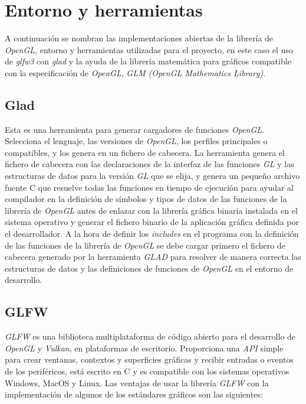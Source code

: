 \documentclass[a4paper]{book}
\begin{document}
\section{Entorno y herramientas}
\label{sec:Entorno}

A continuación se nombran las implementaciones abiertas de la librería de \textit{OpenGL}, entorno y herramientas
utilizadas para el proyecto, en este caso el uso de \textit{glfw3} con \textit{glad} y la ayuda de la librería matemática
para gráficos compatible con la especificación de \textit{OpenGL}, \textit{GLM (OpenGL Mathematics Library)}.

\subsection{Glad}
\label{subsec:Glad}

Esta es una herramienta para generar cargadores de funciones \textit{OpenGL}. Selecciona el lenguaje, las versiones
de \textit{OpenGL}, los perfiles principales o compatibles, y los genera en un fichero de cabecera. La herramienta
genera el fichero de cabecera con las declaraciones de la interfaz de las funciones \textit{GL} y
las estructuras de datos para la versión \textit{GL} que se elija, y genera un pequeño archivo fuente C que
resuelve todas las funciones en tiempo de ejecución para ayudar al compilador en la definición de
símbolos y tipos de datos de las funciones de la librería de \textit{OpenGL} antes de enlazar con la librería
gráfica binaria instalada en el sistema operativo y generar el fichero binario de la aplicación gráfica
definida por el desarrollador. A la hora de definir los \textit{includes} en el programa con la definición de las funciones de la librería de
\textit{OpenGL} se debe cargar primero el fichero de cabecera generado por la herramienta \textit{GLAD} para resolver de
manera correcta las estructuras de datos y las definiciones de funciones de \textit{OpenGL} en el entorno de
desarrollo. \cite{Khronos:_glad}

\subsection{GLFW}
\label{subsec:GLFW}

\textit{GLFW} es una biblioteca multiplataforma de código abierto para el desarrollo de \textit{OpenGL} y \textit{Vulkan},
en plataformas de escritorio. Proporciona una \textit{API} simple para crear ventanas, contextos y superficies
gráficas y recibir entradas o eventos de los periféricos, está escrito en C y es compatible con los sistemas
operativos Windows, MacOS y Linux. Las ventajas de usar la librería \textit{GLFW} con la implementación de algunos de los
estándares gráficos son las siguientes:
\end{document}
